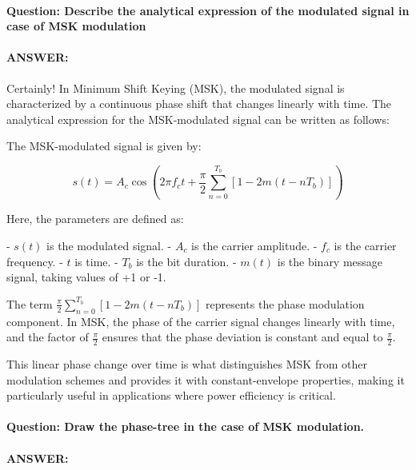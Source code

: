 \documentclass[colorlinks,11pt,a4paper,normalphoto,withhyper,ragged2e]{altareport}
\begin{document}
			
			
				
				\paragraph{Question: Describe the analytical expression of the modulated signal in case of MSK modulation}
				\paragraph{ANSWER:}
				
				Certainly! In Minimum Shift Keying (MSK), the modulated signal is characterized by a continuous phase shift that changes linearly with time. The analytical expression for the MSK-modulated signal can be written as follows:
				
				The MSK-modulated signal is given by:
				
				\[ s(t) = A_c \cos\left(2\pi f_c t + \frac{\pi}{2}\sum_{n=0}^{T_b}\left[1-2m(t-nT_b)\right]\right) \]
				
				Here, the parameters are defined as:
				
				- \(s(t)\) is the modulated signal.
				- \(A_c\) is the carrier amplitude.
				- \(f_c\) is the carrier frequency.
				- \(t\) is time.
				- \(T_b\) is the bit duration.
				- \(m(t)\) is the binary message signal, taking values of +1 or -1.
				
				The term \(\frac{\pi}{2}\sum_{n=0}^{T_b}\left[1-2m(t-nT_b)\right]\) represents the phase modulation component. In MSK, the phase of the carrier signal changes linearly with time, and the factor of \(\frac{\pi}{2}\) ensures that the phase deviation is constant and equal to \(\frac{\pi}{2}\).
				
				This linear phase change over time is what distinguishes MSK from other modulation schemes and provides it with constant-envelope properties, making it particularly useful in applications where power efficiency is critical.
				
				
				
				
				
				
				\paragraph{Question: Draw the phase-tree in the case of MSK modulation.}
				\paragraph{ANSWER:}
				
\end{document}
